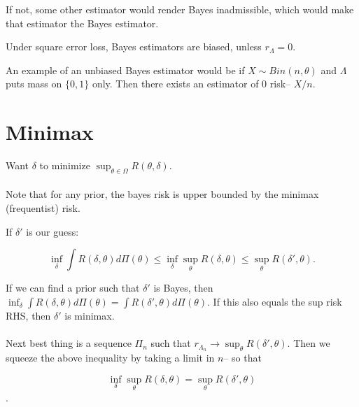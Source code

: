 \documentclass{article}
\begin{document}
\begin{fact}
If not, some other estimator would render Bayes inadmissible, which would make that estimator the Bayes estimator.
\end{fact}

\begin{fact}
Under square error loss, Bayes estimators are biased, unless $r_\Lambda = 0$.
\end{fact}
An example of an unbiased Bayes estimator would be if $X\sim Bin(n,\theta)$ and $\Lambda$ puts mass on $\{0,1\}$ only. Then there exists an estimator of $0$ risk-- $X/n$. 

\section{Minimax}
Want $\delta$ to minimize $\sup_{\theta \in \Omega} R(\theta, \delta)$. \\\\

Note that for any prior, the bayes risk is upper bounded by the minimax (frequentist) risk. 

If $\delta'$ is our guess:

$$\inf_\delta \int R(\delta, \theta) d\Pi (\theta) \leq \inf_\delta \sup_\theta R(\delta, \theta) \leq \sup_\theta R(\delta ', \theta).$$

If we can find a prior such that $\delta'$ is Bayes, then 
$\inf_\delta \int R(\delta, \theta) d\Pi (\theta) = \int R(\delta' , \theta) d\Pi(\theta)$. If this also equals the sup risk RHS, then $\delta'$ is minimax. \\ \\ 

Next best thing is a sequence $\Pi_n$ such that $r_{\Lambda_n} \to \sup_\theta R(\delta ', \theta)$. Then we squeeze the above inequality by taking a limit in $n$-- so that 

$$\inf_\delta \sup_\theta R(\delta, \theta) = \sup_\theta R(\delta', \theta)$$. 
\end{document}
